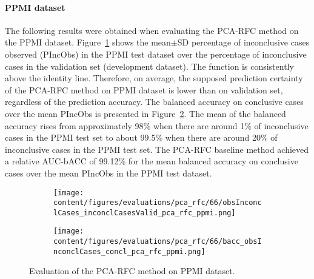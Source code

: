 


\paragraph{PPMI dataset}

The following results were obtained when evaluating the PCA-RFC method on the PPMI dataset.
Figure~\ref{fig:obsInconclCases_inconclCasesValid_pca_rfc_ppmi} shows the
mean$\pm$SD percentage of inconclusive cases observed (PIncObs) in the PPMI test dataset 
over the percentage of inconclusive cases in the validation set (development dataset).
The function is consistently above the identity line.
Therefore, on average, the supposed prediction certainty of the PCA-RFC method on PPMI dataset is lower than on validation set,
regardless of the prediction accuracy.
The balanced accuracy on conclusive cases over the mean PIncObs is presented 
in Figure~\ref{fig:bacc_obsInconclCases_concl_pca_rfc_ppmi}.
The mean of the balanced accuracy rises from approximately 98\% 
when there are around 1\% of inconclusive cases in the PPMI test set to about 99.5\% 
when there are around 20\% of inconclusive cases in the PPMI test set.
The PCA-RFC baseline method achieved a relative AUC-bACC of 99.12\% for the mean balanced accuracy on conclusive cases 
over the mean PIncObs in the PPMI test dataset.

\begin{figure}[ht]
  \begin{subfigure}{0.49\textwidth}
    \centering
    \texttt{[image: content/figures/evaluations/pca\_rfc/66/obsInconclCases\_inconclCasesValid\_pca\_rfc\_ppmi.png]}
    \label{fig:obsInconclCases_inconclCasesValid_pca_rfc_ppmi}
  \end{subfigure}
  \hfill
  \begin{subfigure}{0.49\textwidth}
    \centering
    \texttt{[image: content/figures/evaluations/pca\_rfc/66/bacc\_obsInconclCases\_concl\_pca\_rfc\_ppmi.png]}
    \label{fig:bacc_obsInconclCases_concl_pca_rfc_ppmi}
  \end{subfigure}
  \caption{Evaluation of the PCA-RFC method on PPMI dataset.}
  \label{fig:perf_results_rfc_ppmi}
\end{figure}



